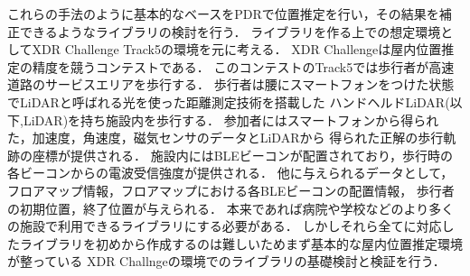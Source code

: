 これらの手法のように基本的なベースをPDRで位置推定を行い，その結果を補正できるようなライブラリの検討を行う．
ライブラリを作る上での想定環境としてXDR Challenge Track5の環境を元に考える．
XDR Challengeは屋内位置推定の精度を競うコンテストである．
このコンテストのTrack5では歩行者が高速道路のサービスエリアを歩行する．
歩行者は腰にスマートフォンをつけた状態でLiDARと呼ばれる光を使った距離測定技術を搭載した
ハンドヘルドLiDAR(以下,LiDAR)を持ち施設内を歩行する．
参加者にはスマートフォンから得られた，加速度，角速度，磁気センサのデータとLiDARから
得られた正解の歩行軌跡の座標が提供される．
施設内にはBLEビーコンが配置されており，歩行時の各ビーコンからの電波受信強度が提供される．
他に与えられるデータとして，フロアマップ情報，フロアマップにおける各BLEビーコンの配置情報，
歩行者の初期位置，終了位置が与えられる．
本来であれば病院や学校などのより多くの施設で利用できるライブラリにする必要がある．
しかしそれら全てに対応したライブラリを初めから作成するのは難しいためまず基本的な屋内位置推定環境が整っている
XDR Challngeの環境でのライブラリの基礎検討と検証を行う．
